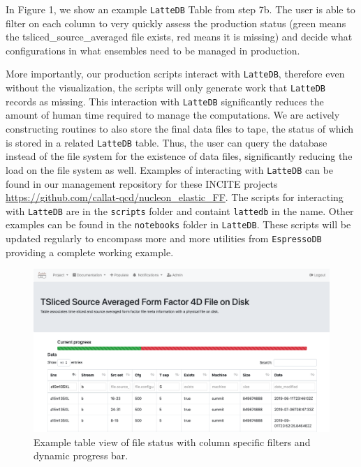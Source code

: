 In Figure 1, we show an example \texttt{LatteDB} Table from step 7b. The
user is able to filter on each column to very quickly assess the
production status (green means the tsliced\_source\_averaged file
exists, red means it is missing) and decide what configurations in what
ensembles need to be managed in production.

More importantly, our production scripts interact with \texttt{LatteDB},
therefore even without the visualization, the scripts will only generate
work that \texttt{LatteDB} records as missing. This interaction with
\texttt{LatteDB} significantly reduces the amount of human time required
to manage the computations. We are actively constructing routines to
also store the final data files to tape, the status of which is stored
in a related \texttt{LatteDB} table. Thus, the user can query the
database instead of the file system for the existence of data files,
significantly reducing the load on the file system as well.
Examples of interacting with \texttt{LatteDB} can be found in
our management repository for these INCITE projects
\url{https://github.com/callat-qcd/nucleon_elastic_FF}.
The scripts for interacting with \texttt{LatteDB} are in the \texttt{scripts} folder and containt \texttt{lattedb} in the name.
Other examples can be found in the \texttt{notebooks} folder in
\texttt{LatteDB}. These scripts will be updated regularly to encompass
more and more utilities from \texttt{EspressoDB} providing a complete
working example.

\begin{figure}
\centering
\includegraphics{lattedb-example.png}
\caption{Example table view of file status with column specific filters
and dynamic progress bar.}
\end{figure}

